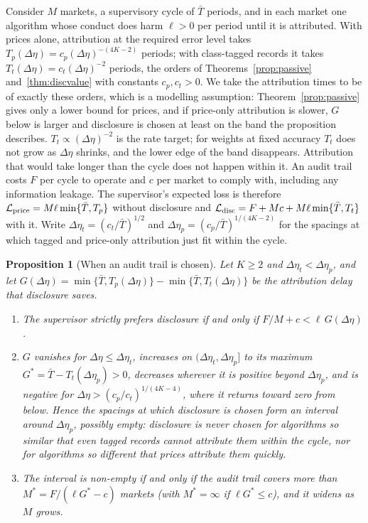 \documentclass[12pt]{article}
\newtheorem{proposition}[theorem]{Proposition}
\theoremstyle{definition}
\theoremstyle{remark}
\begin{document}
Consider $M$ markets, a supervisory cycle of $\bar T$ periods, and in each market one algorithm whose conduct does harm $\ell>0$ per period until it is attributed. With prices alone, attribution at the required error level takes $T_p(\Delta\eta)=c_p(\Delta\eta)^{-(4K-2)}$ periods; with class-tagged records it takes $T_t(\Delta\eta)=c_t(\Delta\eta)^{-2}$ periods, the orders of Theorems~\ref{prop:passive} and~\ref{thm:discvalue} with constants $c_p,c_t>0$. We take the attribution times to be of exactly these orders, which is a modelling assumption: Theorem~\ref{prop:passive} gives only a lower bound for prices, and if price-only attribution is slower, $G$ below is larger and disclosure is chosen at least on the band the proposition describes. $T_t\propto(\Delta\eta)^{-2}$ is the rate target; for weights at fixed accuracy $T_t$ does not grow as $\Delta\eta$ shrinks, and the lower edge of the band disappears. Attribution that would take longer than the cycle does not happen within it. An audit trail costs $F$ per cycle to operate and $c$ per market to comply with, including any information leakage. The supervisor's expected loss is therefore $\mathcal L_{\rm price}=M\ell\min\{\bar T,T_p\}$ without disclosure and $\mathcal L_{\rm disc}=F+Mc+M\ell\min\{\bar T,T_t\}$ with it. Write $\Delta\eta_t=(c_t/\bar T)^{1/2}$ and $\Delta\eta_p=(c_p/\bar T)^{1/(4K-2)}$ for the spacings at which tagged and price-only attribution just fit within the cycle.

\begin{proposition}[When an audit trail is chosen]\label{prop:choice}
Let $K\ge2$ and $\Delta\eta_t<\Delta\eta_p$, and let $G(\Delta\eta)=\min\{\bar T,T_p(\Delta\eta)\}-\min\{\bar T,T_t(\Delta\eta)\}$ be the attribution delay that disclosure saves.
\begin{enumerate}[label=(\roman*),itemsep=1pt]
\item The supervisor strictly prefers disclosure if and only if $F/M+c<\ell\,G(\Delta\eta)$.
\item $G$ vanishes for $\Delta\eta\le\Delta\eta_t$, increases on $(\Delta\eta_t,\Delta\eta_p]$ to its maximum $G^*=\bar T-T_t(\Delta\eta_p)>0$, decreases wherever it is positive beyond $\Delta\eta_p$, and is negative for $\Delta\eta>(c_p/c_t)^{1/(4K-4)}$, where it returns toward zero from below. Hence the spacings at which disclosure is chosen form an interval around $\Delta\eta_p$, possibly empty: disclosure is never chosen for algorithms so similar that even tagged records cannot attribute them within the cycle, nor for algorithms so different that prices attribute them quickly.
\item The interval is non-empty if and only if the audit trail covers more than $M^*=F/(\ell G^*-c)$ markets (with $M^*=\infty$ if $\ell G^*\le c$), and it widens as $M$ grows.
\end{enumerate}
\end{proposition}
\end{document}
